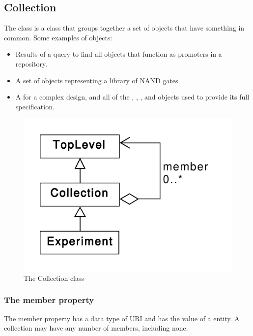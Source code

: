 \subsection {Collection}
\label{sec:Collection}
The  class is a class that groups together a set of  objects that have something in common. 
Some examples of  objects:
\begin{itemize}
\item Results of a query to find all  objects that function as promoters in a repository.
\item A set of  objects representing a library of NAND gates.
\item A  for a complex design, and all of the , , , and  objects used to provide its full specification.
\end{itemize}

\begin{figure}[ht]
\begin{center}
\includegraphics[scale=0.6]{uml/collection}
\caption[]{The Collection class}
\label{uml:collection}
\end{center}
\end{figure}

\subsubsection*{The member property}
The member property has a data type of URI and has the  value of a  entity.  A collection may have any number of members, including none.

